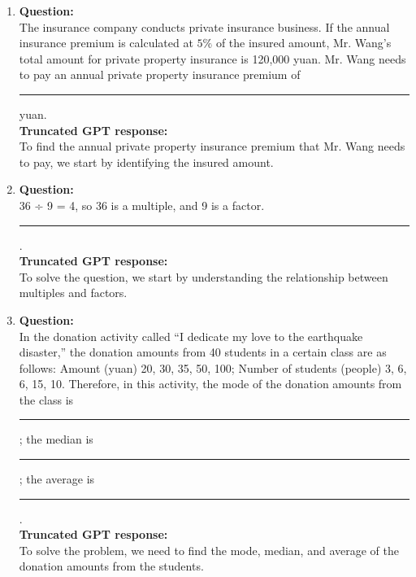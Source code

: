 \begin{enumerate}[
    label=\textbf{Example \arabic*.}, 
    wide=0pt,             %
    labelsep=0.5em,       %
    itemsep=0.5em,        %
    parsep=0.5em          %
]
    \item \textbf{Question:} \\
    The insurance company conducts private insurance business. If the annual insurance premium is calculated at $5\%$ of the insured amount, Mr. Wang's total amount for private property insurance is 120{,}000 yuan. Mr. Wang needs to pay an annual private property insurance premium of \rule{1.5cm}{0.4pt} yuan.\\[0.5em]
    \textbf{Truncated GPT response:} \\
    To find the annual private property insurance premium that Mr. Wang needs to pay, we start by identifying the insured amount. 
~\\
    \item \textbf{Question:} \\
    36 ÷ 9 = 4, so 36 is a multiple, and 9 is a factor. \rule{1.5cm}{0.4pt}.\\[0.5em]
    \textbf{Truncated GPT response:} \\
    To solve the question, we start by understanding the relationship between multiples and factors. 
~\\
    \item \textbf{Question:} \\
    In the donation activity called ``I dedicate my love to the earthquake disaster,'' the donation amounts from 40 students in a certain class are as follows: Amount (yuan) 20, 30, 35, 50, 100; Number of students (people) 3, 6, 6, 15, 10. Therefore, in this activity, the mode of the donation amounts from the class is \rule{1.5cm}{0.4pt}; the median is \rule{1.5cm}{0.4pt}; the average is \rule{1.5cm}{0.4pt}.\\[0.5em]
    \textbf{Truncated GPT response:} \\
    To solve the problem, we need to find the mode, median, and average of the donation amounts from the students.
\end{enumerate}





